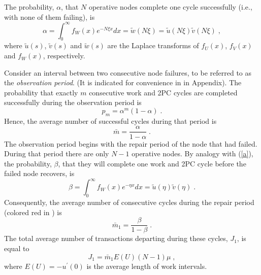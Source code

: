 The probability, $\alpha$, that $N$ operative nodes complete one  cycle
successfully (i.e., with none of them failing), is
\begin{equation} \label{a}
\alpha = \int_0^\infty f_W(x)e^{-N\xi x}dx = \tilde{w}(N\xi) = \tilde{u}(N\xi)\tilde{v}(N\xi) \;,
\end{equation}
where $\tilde{u}(s)$, $\tilde{v}(s)$ and $\tilde{w}(s)$ are the Laplace transforms
of $f_U(x)$, $f_V(x)$ and $f_W(x)$, respectively.


Consider an interval between two consecutive node failures, to be referred to as the
\emph{observation period}. (It is indicated for convenience in  in Appendix).
The probability that exactly $m$ consecutive work and 2PC cycles are completed
successfully during the observation period is
\begin{equation}
p_m = \alpha ^m (1-\alpha )\;.
\end{equation}
Hence, the average number of successful cycles during that period is
\begin{equation}
\bar{m} = \frac{\alpha }{1 -\alpha }\;.
\end{equation}
The observation period begins with the repair period of the node that had failed. During that period there are only $N-1$ operative nodes. By analogy
with (\ref{a}), the probability, $\beta$, that they will complete one work and 2PC cycle
before the failed node recovers, is
\begin{equation}
\beta = \int_0^\infty f_W(x)e^{-\eta x}dx = \tilde{u}(\eta)\tilde{v}(\eta) \;.
\end{equation}
Consequently, the average number of consecutive %
cycles during the repair
period (colored red in ) is
\begin{equation}
\bar{m}_1 = \frac{\beta }{1 -\beta }\;.
\end{equation}
The total average number of transactions departing during these cycles,
$J_1$, is equal to
\begin{equation} \label{J1}
J_1 = \bar{m}_1 E(U) (N-1)\mu\;,
\end{equation}
where $E(U)=-u^\prime(0)$ is the average length of work intervals.

